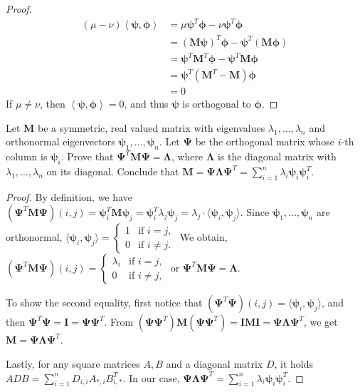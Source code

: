 \documentclass[11pt,letterpaper]{article}
\begin{document}
\begin{proof}
    \begin{align*}
      (\mu - \nu)\left\langle \bm{\psi}, \bm{\phi} \right\rangle
      &= \mu \bm{\psi}^T \bm{\phi} - \nu \bm{\psi}^T \bm{\phi}\\
      &= (\bm{M}\bm{\psi})^T \bm{\phi} - \bm{\psi}^T (\bm{M}\bm{\phi})\\
      &= \bm{\psi}^T \bm{M}^T \bm{\phi} - \bm{\psi}^T \bm{M}\bm{\phi}\\
      &= \bm{\psi}^T (\bm{M}^T -  \bm{M}) \bm{\phi}\\
      &= 0
    \end{align*}
    If $\mu \neq \nu$, then $\left\langle \bm{\psi}, \bm{\phi} \right\rangle = 0$,
    and thus $\bm{\psi}$ is orthogonal to $\bm{\phi}$.
\end{proof}

\begin{exercise}
  Let $\bm{M}$ be a symmetric, real valued matrix with eigenvalues $\lambda_1,\ldots,\lambda_n$ and
  orthonormal eigenvectors $\bm{\psi}_1,\ldots,\bm{\psi}_n$.
  Let $\bm{\Psi}$ be the orthogonal matrix whose $i$-th column is $\bm{\psi}_i$.
  Prove that $\bm{\Psi}^T \bm{M} \bm{\Psi} = \bm{\Lambda}$,
  where $\bm{\Lambda}$ is the diagonal matrix with $\lambda_1,\ldots,\lambda_n$ on its diagonal.
  Conclude that $\bm{M}=\bm{\Psi} \bm{\Lambda} \bm{\Psi}^T = \sum_{i=1}^n \lambda_i \bm{\psi}_i\bm{\psi}_i^T$.
\end{exercise}

\begin{proof}
  By definition, we have $(\bm{\Psi}^T \bm{M} \bm{\Psi})(i,j) = \bm{\psi}_i^T \bm{M} \bm{\psi}_j
  =\bm{\psi}_i^T \lambda_j \bm{\psi}_j = \lambda_j \cdot \langle \bm{\psi}_i, \bm{\psi}_j\rangle$.
  Since $\bm{\psi}_1,\ldots,\bm{\psi}_n$ are orthonormal, $\langle \bm{\psi}_i, \bm{\psi}_j\rangle =
  \begin{cases}
    1 & \text{if } i=j,\\
    0 & \text{if } i \neq j.
  \end{cases}$
%
  We obtain, $(\bm{\Psi}^T \bm{M} \bm{\Psi})(i,j) = \begin{cases}
    \lambda_i &\text{if } i=j,\\
    0 &\text{if }i \neq j,
  \end{cases}$
  or $\bm{\Psi}^T \bm{M} \bm{\Psi} = \bm{\Lambda}$.

  To show the second equality, first notice that
  $(\bm{\Psi}^T\bm{\Psi})(i,j)=\langle\bm{\psi}_i,\bm{\psi}_j\rangle$,
  and then $\bm{\Psi}^T\bm{\Psi} = \bm{I} = \bm{\Psi} \bm{\Psi}^T$.
  From $\left(\bm{\Psi} \bm{\Psi}^T\right)\bm{M}\left(\bm{\Psi} \bm{\Psi}^T\right)
  = \bm{I} \bm{M} \bm{I}
  = \bm{\Psi} \bm{\Lambda} \bm{\Psi}^T$, we get $\bm{M}=\bm{\Psi} \bm{\Lambda} \bm{\Psi}^T$.

  Lastly, for any square matrices $A, B$ and a diagonal matrix $D$,
  it holds $ADB = \sum_{i=1}^n D_{i,i} A_{*,i} B_{i,*}^T$.
  In our case, $\bm{\Psi} \bm{\Lambda} \bm{\Psi}^T =
  \sum_{i=1}^n \lambda_i\bm{\psi}_i \bm{\psi}_i^T$.
\end{proof}
\end{document}
